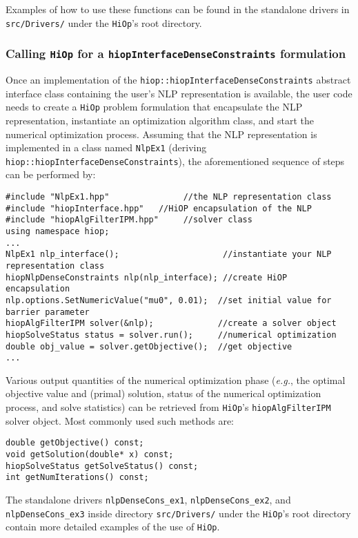 \documentclass[11pt]{article}
\newcommand{\Hi}{\texttt{HiOp}\xspace}
\begin{document}
Examples of how to use these functions can be found in the standalone drivers in \texttt{src/Drivers/} under the \Hi's root directory.


\subsubsection{Calling \Hi for a \texttt{hiopInterfaceDenseConstraints} formulation}
Once an implementation of the \texttt{hiop::hiopInterfaceDenseConstraints} abstract interface class containing the user's NLP representation is available, the  user code needs to create a \Hi problem formulation that encapsulate the NLP representation, instantiate an optimization algorithm class, and start the numerical optimization process. Assuming that the NLP representation is implemented in a class named \texttt{NlpEx1} (deriving \texttt{hiop::hiopInterfaceDenseConstraints}), the aforementioned sequence of steps can be performed by:
\begin{lstlisting}
#include "NlpEx1.hpp"               //the NLP representation class
#include "hiopInterface.hpp"   //HiOP encapsulation of the NLP
#include "hiopAlgFilterIPM.hpp"     //solver class
using namespace hiop;
...
NlpEx1 nlp_interface();                     //instantiate your NLP representation class
hiopNlpDenseConstraints nlp(nlp_interface); //create HiOP encapsulation
nlp.options.SetNumericValue("mu0", 0.01);  //set initial value for  barrier parameter
hiopAlgFilterIPM solver(&nlp);             //create a solver object
hiopSolveStatus status = solver.run();     //numerical optimization
double obj_value = solver.getObjective();  //get objective
...
\end{lstlisting}
Various output quantities of the numerical optimization phase (\textit{e.g.}, the optimal objective value and (primal) solution, status of the numerical optimization process, and solve statistics) can be retrieved from \Hi's \texttt{hiopAlgFilterIPM} solver object. Most commonly used such methods are: 
\begin{lstlisting}
double getObjective() const;
void getSolution(double* x) const;
hiopSolveStatus getSolveStatus() const;
int getNumIterations() const;
\end{lstlisting} 
The standalone drivers \texttt{nlpDenseCons\_ex1}, \texttt{nlpDenseCons\_ex2}, and \texttt{nlpDenseCons\_ex3} inside directory \texttt{src/Drivers/} under the \Hi's root directory contain more detailed examples of the use of \Hi.
\end{document}

